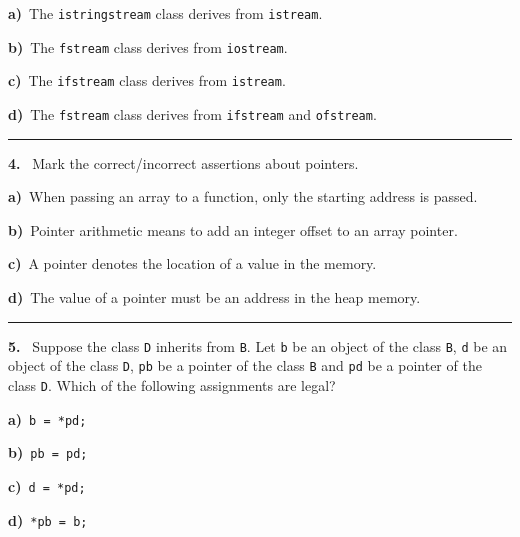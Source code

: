 \begin{multicols}{2}
{\bf a)}\ The \verb|istringstream| class derives from \verb|istream|.

{\bf b)}\ The \verb|fstream| class derives from \verb|iostream|.

{\bf c)}\ The \verb|ifstream| class derives from \verb|istream|.

{\bf d)}\ The \verb|fstream| class derives from \verb|ifstream| and \verb|ofstream|.

\par\smallskip\hrule\par\medskip

{\bf 4. }\ Mark the correct/incorrect assertions about pointers.

{\bf a)}\ When passing an array to a function, only the starting address is passed.

{\bf b)}\ Pointer arithmetic means to add an integer offset to an array pointer.

{\bf c)}\ A pointer denotes the location of a value in the memory.

{\bf d)}\ The value of a pointer must be an address in the heap memory.

\par\smallskip\hrule\par\medskip

{\bf 5. }\ Suppose the class \verb|D| inherits from \verb|B|. Let
\verb|b| be an object of the class \verb|B|,
\verb|d| be an object of the class \verb|D|,
\verb|pb| be a pointer of the class \verb|B| and
\verb|pd| be a pointer of the class \verb|D|.
Which of the following assignments are legal?

{\bf a)}\ \verb|b = *pd;|

{\bf b)}\ \verb|pb = pd;|

{\bf c)}\ \verb|d = *pd;|

{\bf d)}\ \verb|*pb = b;|

\end{multicols}


